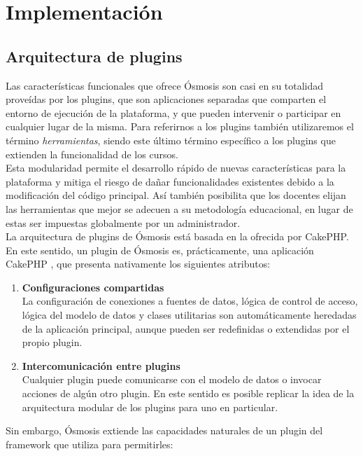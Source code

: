 \chapter{Implementación}

\section{Arquitectura de plugins}
Las características funcionales que ofrece Ósmosis son casi en su totalidad proveídas por los plugins, que son aplicaciones separadas que comparten el entorno de ejecución de la plataforma, y que pueden intervenir o participar en cualquier lugar de la misma. Para referirnos a los plugins también utilizaremos el término \emph{herramientas}, siendo este último término específico a los plugins que extienden la funcionalidad de los cursos.\\

Esta modularidad permite el desarrollo rápido de nuevas características para la plataforma y mitiga el riesgo de dañar funcionalidades existentes debido a la modificación del código principal. Así también posibilita que los docentes elijan las herramientas que mejor se adecuen a su metodología educacional, en lugar de estas ser impuestas globalmente por un administrador.\\

La arquitectura de plugins de Ósmosis está basada en la ofrecida por CakePHP. En este sentido, un plugin de Ósmosis es, prácticamente, una aplicación CakePHP \citep{CakePHP_Plugins_2008}, que presenta nativamente los siguientes atributos:

\begin{enumerate}
	\item \textbf{Configuraciones compartidas} \\
	La configuración de conexiones a fuentes de datos, lógica de control de acceso, lógica del modelo de datos y clases utilitarias son automáticamente heredadas de la aplicación principal, aunque pueden ser redefinidas o extendidas por el propio plugin.
	\item \textbf{Intercomunicación entre plugins} \\
	Cualquier plugin puede comunicarse con el modelo de datos o invocar acciones de algún otro plugin. En este sentido es posible replicar la idea de la arquitectura modular de los plugins para uno en particular.
\end{enumerate}

Sin embargo, Ósmosis extiende las capacidades naturales de un plugin del framework que utiliza para permitirles:

